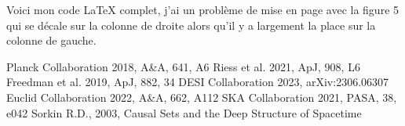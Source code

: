 Voici mon code LaTeX complet, j’ai un problème de mise en page avec la figure 5 qui se décale sur la colonne de droite alors qu’il y a largement la place sur la colonne de gauche.  \documentclass[aps,prl,twocolumn,groupedaddress]{revtex4-2}
\begin{document}
\begin{thebibliography}{9}
 Planck Collaboration 2018, A\&A, 641, A6
 Riess et al. 2021, ApJ, 908, L6
 Freedman et al. 2019, ApJ, 882, 34
 DESI Collaboration 2023, arXiv:2306.06307
 Euclid Collaboration 2022, A\&A, 662, A112
 SKA Collaboration 2021, PASA, 38, e042
 Sorkin R.D., 2003, Causal Sets and the Deep Structure of Spacetime
\end{thebibliography}
\end{document}
